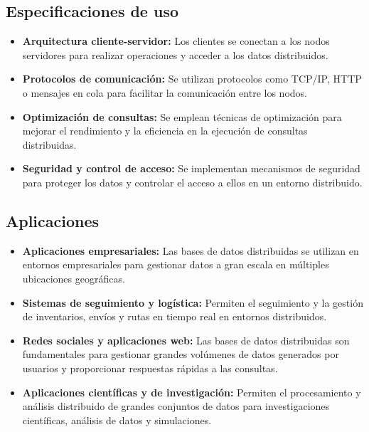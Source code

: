 \subsection{Especificaciones de uso}
\noindent
\begin{itemize}
	\item \textbf{Arquitectura cliente-servidor:} Los clientes se conectan a los nodos servidores para realizar operaciones y acceder a los datos distribuidos.
	\item \textbf{Protocolos de comunicación:} Se utilizan protocolos como TCP/IP, HTTP o mensajes en cola para facilitar la comunicación entre los nodos.
	\item \textbf{Optimización de consultas:} Se emplean técnicas de optimización para mejorar el rendimiento y la eficiencia en la ejecución de consultas distribuidas.
	\item \textbf{Seguridad y control de acceso:} Se implementan mecanismos de seguridad para proteger los datos y controlar el acceso a ellos en un entorno distribuido.
\end{itemize}

\subsection{Aplicaciones}
\noindent
\begin{itemize}
	\item \textbf{Aplicaciones empresariales:} Las bases de datos distribuidas se utilizan en entornos empresariales para gestionar datos a gran escala en múltiples ubicaciones geográficas.
	\item \textbf{Sistemas de seguimiento y logística:} Permiten el seguimiento y la gestión de inventarios, envíos y rutas en tiempo real en entornos distribuidos.
	\item \textbf{Redes sociales y aplicaciones web:} Las bases de datos distribuidas son fundamentales para gestionar grandes volúmenes de datos generados por usuarios y proporcionar respuestas rápidas a las consultas.
	\item \textbf{Aplicaciones científicas y de investigación:} Permiten el procesamiento y análisis distribuido de grandes conjuntos de datos para investigaciones científicas, análisis de datos y simulaciones.
\end{itemize}

